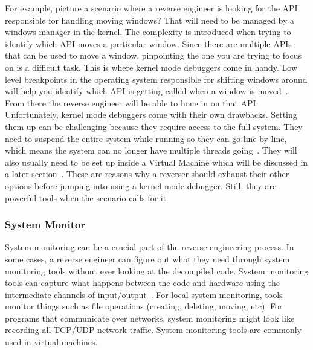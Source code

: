 \documentclass[12pt]{article}
\begin{document}
For example, picture a scenario where a reverse engineer is looking for the API responsible for handling moving windows? That will need to be managed by a windows manager in the kernel. The complexity is introduced when trying to identify which API moves a particular window. Since there are multiple APIs that can be used to move a window, pinpointing the one you are trying to focus on is a difficult task. This is where kernel mode debuggers come in handy. Low level breakpoints in the operating system responsible for shifting windows around will help you identify which API is getting called when a window is moved~\cite{Reversing}. From there the reverse engineer will be able to hone in on that API.
Unfortunately, kernel mode debuggers come with their own drawbacks. Setting them up can be challenging because they require access to the full system. They need to suspend the entire system while running so they can go line by line, which means the system can no longer have multiple threads going~\cite{Reversing}. They will also usually need to be set up inside a Virtual Machine which will be discussed in a later section~\cite{PracticalRE}. These are reasons why a reverser should exhaust their other options before jumping into using a kernel mode debugger. Still, they are powerful tools when the scenario calls for it.

\subsubsection{System Monitor}
System monitoring can be a crucial part of the reverse engineering process. In some cases, a reverse engineer can figure out what they need through system monitoring tools without ever looking at the decompiled code. System monitoring tools can capture what happens between the code and hardware using the intermediate channels of input/output~\cite{Reversing}. For local system monitoring, tools monitor things such as file operations (creating, deleting, moving, etc). For programs that communicate over networks, system monitoring might look like recording all TCP/UDP network traffic. System monitoring tools are commonly used in virtual machines.
\end{document}
